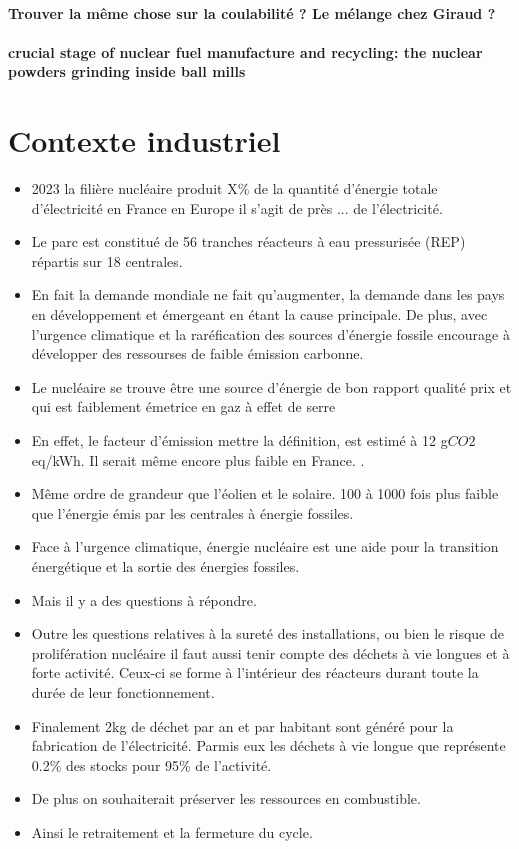 \paragraph{Trouver la même chose sur la coulabilité ? Le mélange chez Giraud ?}

\paragraph{crucial stage of nuclear fuel manufacture and recycling: the nuclear powders grinding inside ball mills}



\section{Contexte industriel}

\begin{itemize}
    \item 2023 la filière nucléaire produit X\% de la quantité d'énergie totale d'électricité en France en Europe il s'agit de près ... de l'électricité.
    \item Le parc est constitué de 56 tranches réacteurs à eau pressurisée (REP) répartis sur 18 centrales.
    \item En fait la demande mondiale ne fait qu'augmenter, la demande dans les pays en développement et émergeant en étant la cause principale. De plus, avec l'urgence climatique et la raréfication des sources d'énergie fossile encourage à développer des ressourses de faible émission carbonne.
    \item Le nucléaire se trouve être une source d'énergie de bon rapport qualité prix et qui est faiblement émetrice en gaz à effet de serre
    \item En effet, le facteur d'émission {mettre la définition}, est estimé à 12 g$CO2$eq/kWh. Il serait même encore plus faible en France. \cite{schlomer_technology-specific_nodate}.
    \item Même ordre de grandeur que l'éolien et le solaire. 100 à 1000 fois plus faible que l'énergie émis par les centrales à énergie fossiles.
    \item Face à l'urgence climatique, énergie nucléaire est une aide pour la transition énergétique et la sortie des énergies fossiles.
    \item Mais il y a des questions à répondre.
    \item Outre les questions relatives à la sureté des installations, ou bien le risque de prolifération nucléaire il faut aussi tenir compte des déchets à vie longues et à forte activité. Ceux-ci se forme à l'intérieur des réacteurs durant toute la durée de leur fonctionnement.
    \item Finalement 2kg de déchet par an et par habitant sont généré pour la fabrication de l'électricité. Parmis eux les déchets à vie longue que représente 0.2\% des stocks pour 95\% de l'activité.
    \item De plus on souhaiterait préserver les ressources en combustible.
    \item Ainsi le retraitement et la fermeture du cycle.
\end{itemize}

